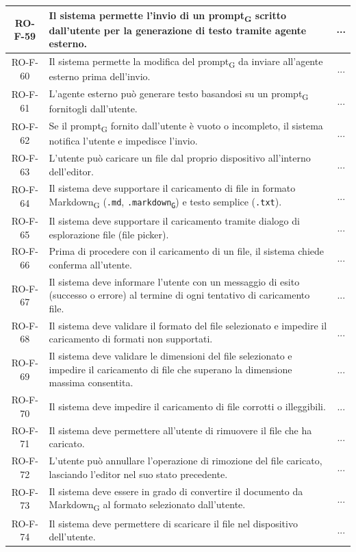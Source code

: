 \documentclass[11pt,a4paper]{article}
\newcommand{\gls}[1]{#1\textsubscript{G}}
\begin{document}
\begin{longtable}{|c|p{11cm}|c|}
\hline
RO-F-59 & Il sistema permette l'invio di un \gls{prompt} scritto dall'utente per la generazione di testo tramite agente esterno. & ... \\
\hline
RO-F-60 & Il sistema permette la modifica del \gls{prompt} da inviare all'agente esterno prima dell'invio. & ... \\
\hline
RO-F-61 & L'agente esterno può generare testo basandosi su un \gls{prompt} fornitogli dall'utente. & ... \\
\hline
RO-F-62 & Se il \gls{prompt} fornito dall'utente è vuoto o incompleto, il sistema notifica l'utente e impedisce l'invio. & ... \\
\hline
RO-F-63 & L'utente può caricare un file dal proprio dispositivo all'interno dell'editor. & ... \\
\hline
RO-F-64 & Il sistema deve supportare il caricamento di file in formato \gls{Markdown} (\texttt{.md}, \texttt{.\gls{markdown}}) e testo semplice (\texttt{.txt}). & ... \\
\hline
RO-F-65 & Il sistema deve supportare il caricamento tramite dialogo di esplorazione file (file picker). & ... \\
\hline
RO-F-66 & Prima di procedere con il caricamento di un file, il sistema chiede conferma all'utente. & ... \\
\hline
RO-F-67 & Il sistema deve informare l'utente con un messaggio di esito (successo o errore) al termine di ogni tentativo di caricamento file. & ... \\
\hline
RO-F-68 & Il sistema deve validare il formato del file selezionato e impedire il caricamento di formati non supportati. & ... \\
\hline
RO-F-69 & Il sistema deve validare le dimensioni del file selezionato e impedire il caricamento di file che superano la dimensione massima consentita. & ... \\
\hline
RO-F-70 & Il sistema deve impedire il caricamento di file corrotti o illeggibili. & ... \\
\hline
RO-F-71 & Il sistema deve permettere all'utente di rimuovere il file che ha caricato. & ... \\
\hline
RO-F-72 & L'utente può annullare l'operazione di rimozione del file caricato, lasciando l'editor nel suo stato precedente. & ... \\
\hline
RO-F-73 & Il sistema deve essere in grado di convertire il documento da \gls{Markdown} al formato selezionato dall'utente. & ... \\
\hline
RO-F-74 & Il sistema deve permettere di scaricare il file nel dispositivo dell'utente. & ... \\

\end{longtable}
\end{document}
